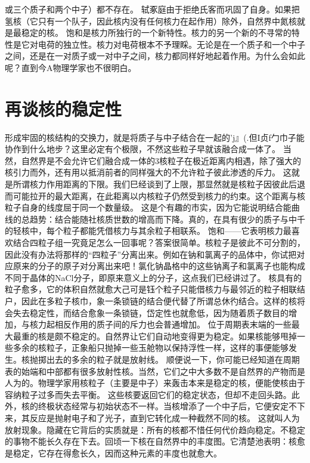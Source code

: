或三个质子和两个中子）都不存在。
轼豖庭由于拒绝氏客而巩固了自身。如果把氢核（它只有一个队子，因此核内没有任何核力在起作用）除外，自然界中氮核就是最稳定的核。
饱和是核力所独行的一个新特性。核力的另一个新的不寻常的特性是它对电荷的独立性。核力对电荷根本不予理睬。无论是在一个质子和一个中子之间，还是在一对质子或一对中子之间，核力都同样好地起着作用。为什么会如此呢？直到今A物理学家也不很明白。

\section{再谈核的稳定性}

形成牢固的核结构的交换力，就是将质子与中子结合在一起的'j』(.但I贞f勹巾子能协作到什么地步？这里必定有个极限，不然这些粒子早就该融合成一体了。
当然，自然界是不会允许它们融合成一体的3核粒子在极近距离内相遇，除了强大的核引力而外，还有用以抵消前者的同样强大的不允许粒子彼此渗透的斥力。
这就是所谓核力作用距离的下限。我们巳经谈到了上限，那显然就是核粒子因彼此后退而可能拉开的最大距离，在此耟离以内核粒子仍然受到核力的约束。这个距离与核粒子自身的线度屈于同一个数量级。
这是个有趣的市实，因为它能说明结合能曲线的总趋势：结合能随社核质世数的增高而下降。真的，在具有很少的质子与中千的轻核中，每个粒子都能凭借核力与其余粒子相联系。
饱和——它表明核力最喜欢结合四粒子组一究竟足怎么一回事呢？答案很简单。核粒子是彼此不可分割的，因此没有办法将那样的“四粒子”分离出来。例如在钠和氯离子的品体中，你试把对应原来的分子的原子对分离出来吧！氯化钠晶格中的这些钠离子和氯离子也能构成不同于晶体的NaCl分子，即原来意义上的分子，这点我们已经讲过了。
核具有的粒子愈多，它的体积自然就愈大己可是钰个粒子只能借核力与最邻近的粒子相联结户，因此在多粒子核巾，象一条锁链的结合便代替了所谓总休彴结合。这样的核将会失去稳定性，而结合愈象一条锁链，岱定性也就愈低，因为随着质子数目的增加，与核力起相反作用的质子间的斥力也会普通增加。
位于周期表末端的一些最大最重的核是颇不稳定的。自然界让它们自动地变得更为稳定。如果核能够甩掉一些多余的核粒子，正象船只抛掉一些玉舱物以保持浮性一样，这样的事便能够发生。核抛掷出去的多余的粒子就是放射线。
顺便说一下，你可能已经知道在周期表的始端和中部都有很多放射性核。当然，它们之中大多数不是自然界的产物而是人为的。物理学家用核粒子（主要是中子）来轰击本来是稳定的核，便能使核由于容纳粒子过多而失去平衡。
这些核要返回它们的稳定状态，但却不走回头路。此外，核的终极状态经常与初始状态不一样。当核增添了一个中子后，它便安定不下来，其反应是抛射电子和了光子，直到它转化成一种截然不同的核。
这就叫人为放射现象。隐藏在它背后的实质就是：所有的核都不惜任何代价趋向稳定。不稳定的事物不能长久存在下去。回顷一下核在自然界中的丰度图。它清楚池表明：核愈是稳定，它存在得愈长久，因而这种元素的丰度也就愈大。

